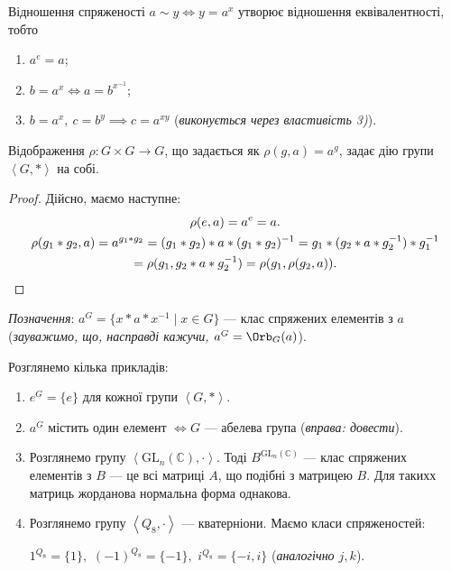 \documentclass{math_library}
\begin{document}
\begin{proposition}
Відношення спряженості $a \sim y \iff y = a^x$ утворює відношення еквівалентності, тобто
\begin{enumerate}[topsep=0pt,nosep,wide=0pt,label={\arabic*)}]
\item $a^e = a$;
\item $b = a^x \iff a = b^{x^{-1}}$;
\item $b = a^x,\ c = b^y \implies c = a^{xy}$ (\textit{виконується через властивість 3)}).
\end{enumerate}
\end{proposition}

\begin{proposition}
Відображення $\rho \colon G \times G \to G$, що задається як $\rho(g,a) = a^g$, задає дію групи $\left<G,*\right>$ на собі.
\end{proposition}

\begin{proof}
Дійсно, маємо наступне:
\begin{gather*}
\rho(e,a) = a^e = a. \\
\rho(g_1*g_2,a) = a^{g_1*g_2} = (g_1*g_2)*a*(g_1*g_2)^{-1} = g_1*(g_2*a*g_2^{-1})*g_1^{-1} \\ = \rho(g_1,g_2*a*g_2^{-1}) = \rho(g_1,\rho(g_2,a)). \qedhere
\end{gather*}
\end{proof}

\textit{Позначення}: $a^G = \{ x*a*x^{-1} \mid x \in G\}$ --- клас спряжених елементів з $a$ (\textit{зауважимо, що, насправді кажучи, $a^G = \Orb_G(a)$}).

\begin{example}
Розглянемо кілька прикладів:
\begin{enumerate}[nosep,wide=0pt,label={\arabic*.}]
\item $e^G = \{e\}$ для кожної групи $\left<G,*\right>$.
\item $a^G$ містить один елемент $\iff G$ --- абелева група (\textit{вправа: довести}).
\item Розглянемо групу $\left< \mathrm{GL}_n(\mathbb{C}), \cdot \right>$. Тоді $B^{\mathrm{GL}_n(\mathbb{C})}$ --- клас спряжених елементів з $B$ --- це всі матриці $A$, що подібні з матрицею $B$. Для такихх матриць жорданова нормальна форма однакова.
\item Розглянемо групу $\left< Q_8, \cdot \right>$ --- кватерніони. Маємо класи спряженостей:
\begin{center}
$1^{Q_8} = \{1\},$ \hspace{0.5cm} $(-1)^{Q_8} = \{-1\},$ \hspace{0.5cm} $i^{Q_8} = \{-i,i\}$ (\textit{аналогічно $j,k$}).
\end{center}
\end{enumerate}
\end{example}
\end{document}
